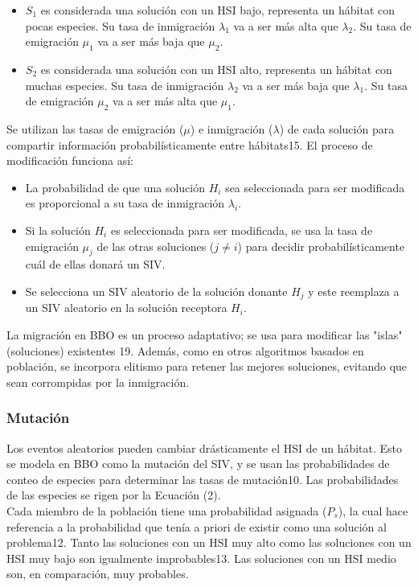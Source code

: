 \begin{itemize}
    \item $S_1$ es considerada una solución con un HSI bajo, representa un hábitat con pocas especies. Su tasa de inmigración $\lambda_1$ va a ser más alta que $\lambda_2$. Su tasa de emigración $\mu_1$ va a ser más baja que $\mu_2$.
    \item $S_2$ es considerada una solución con un HSI alto, representa un hábitat con muchas especies. Su tasa de inmigración $\lambda_2$ va a ser más baja que $\lambda_1$. Su tasa de emigración $\mu_2$ va a ser más alta que $\mu_1$.
\end{itemize}
Se utilizan las tasas de emigración ($\mu$) e inmigración ($\lambda$) de cada solución para compartir información probabilísticamente entre hábitats15. El proceso de modificación funciona así:
\begin{itemize}
    \item La probabilidad de que una solución $H_i$ sea seleccionada para ser modificada es proporcional a su tasa de inmigración $\lambda_i$.
    \item Si la solución $H_i$ es seleccionada para ser modificada, se usa la tasa de emigración $\mu_j$ de las otras soluciones ($j \neq i$) para decidir probabilísticamente cuál de ellas donará un SIV.
    \item Se selecciona un SIV aleatorio de la solución donante $H_j$ y este reemplaza a un SIV aleatorio en la solución receptora $H_i$.
\end{itemize}
La migración en BBO es un proceso adaptativo; se usa para modificar las "islas" (soluciones) existentes 19. Además, como en otros algoritmos basados en población, se incorpora elitismo para retener las mejores soluciones, evitando que sean corrompidas por la inmigración.


\subsubsection{Mutación} \label{sec:mutation}Los eventos aleatorios pueden cambiar drásticamente el HSI de un hábitat. Esto se modela en BBO como la mutación del SIV, y se usan las probabilidades de conteo de especies para determinar las tasas de mutación10. Las probabilidades de las especies se rigen por la Ecuación (2).\\

Cada miembro de la población tiene una probabilidad asignada ($P_s$), la cual hace referencia a la probabilidad que tenía a priori de existir como una solución al problema12. Tanto las soluciones con un HSI muy alto como las soluciones con un HSI muy bajo son igualmente improbables13. Las soluciones con un HSI medio son, en comparación, muy probables.\\

